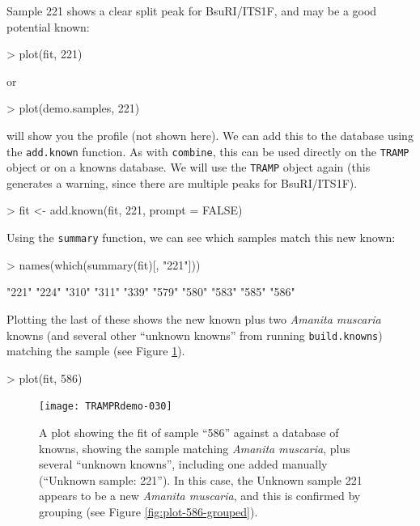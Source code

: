 \documentclass[a4paper]{article}
\newcommand\code\texttt
\begin{document}
Sample 221 shows a clear split peak for BsuRI/ITS1F, and may be a good
potential known:

\begin{Schunk}
\begin{Sinput}
> plot(fit, 221)
\end{Sinput}
\end{Schunk}

or

\begin{Schunk}
\begin{Sinput}
> plot(demo.samples, 221)
\end{Sinput}
\end{Schunk}

will show you the profile (not shown here).  We can add this to the
database using the \code{add.known} function.  As with \code{combine},
this can be used directly on the \code{TRAMP} object or on a knowns
database.  We will use the \code{TRAMP} object again (this generates
a warning, since there are multiple peaks for BsuRI/ITS1F).

\begin{Schunk}
\begin{Sinput}
> fit <- add.known(fit, 221, prompt = FALSE)
\end{Sinput}
\end{Schunk}

Using the \code{summary} function, we can see which samples match this
new known:
\begin{Schunk}
\begin{Sinput}
> names(which(summary(fit)[, "221"]))
\end{Sinput}
\begin{Soutput}
 [1] "221" "224" "310" "311" "339" "579" "580" "583" "585" "586"
\end{Soutput}
\end{Schunk}

Plotting the last of these shows the new known plus two
\textit{Amanita muscaria} knowns (and several other ``unknown knowns''
from running \code{build.knowns}) matching the sample (see Figure
\ref{fig:plot-586}).

\begin{Schunk}
\begin{Sinput}
> plot(fit, 586)
\end{Sinput}
\end{Schunk}

\begin{figure}
  \centering
\texttt{[image: TRAMPRdemo-030]}
\caption{A plot showing the fit of sample ``586'' against a database
  of knowns, showing the sample matching \textit{Amanita muscaria},
  plus several ``unknown knowns'', including one added manually
  (``Unknown sample: 221'').  In this case, the Unknown sample 221
  appears to be a new \textit{Amanita muscaria}, and this is confirmed
  by grouping (see Figure \ref{fig:plot-586-grouped}).}
\label{fig:plot-586}
\end{figure}
\end{document}
